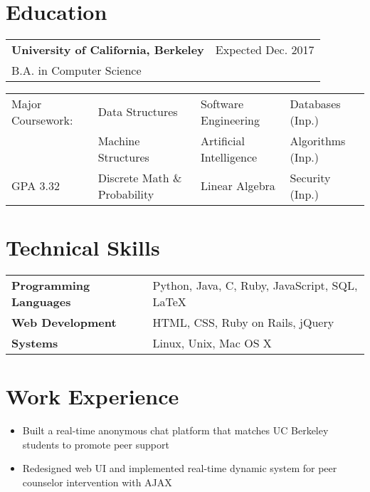 \documentclass{resume_sty}
\begin{document}
\begin{center}
\\
\end{center}

\section{Education}
\begin{tabular*}{\textwidth}{l @{\extracolsep{\fill}} r}
\textbf{University of California, Berkeley} & Expected Dec. 2017\\
B.A. in Computer Science
\end{tabular*}

\begin{tabular}{L{3.5cm} l l l}
Major Coursework: & Data Structures & Software Engineering & Databases (Inp.)\\
& Machine Structures & Artificial Intelligence & Algorithms (Inp.)\\
GPA 3.32 & Discrete Math $\&$ Probability & Linear Algebra & Security (Inp.)\\
\end{tabular}
\section{Technical Skills}
\begin{tabular}{L{4.8cm} l}
\textbf{Programming Languages} & Python, Java, C, Ruby, JavaScript, SQL, \LaTeX\\
\textbf{Web Development} & HTML, CSS, Ruby on Rails, jQuery\\
\textbf{Systems} & Linux, Unix, Mac OS X\\
\end{tabular}

\section{Work Experience}
\begin{itemize}
\item Built a real-time anonymous chat platform that matches UC Berkeley students to promote peer support
\item Redesigned web UI and implemented real-time dynamic system for peer counselor intervention with AJAX
\end{itemize}
\end{document}
